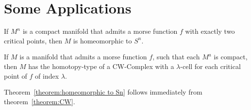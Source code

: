 \section{Some Applications}

\begin{theorem}
    \label{theorem:homeomorphic to Sn}
    If $M^n$ is a compact manifold that admits a morse function $f$ with 
    exactly two critical points, then $M$ is homeomorphic to $S^n$.
\end{theorem}

\begin{theorem}
    \label{theorem:CW}
    If $M$ is a manifold that admits a morse function $f$, such that each $M^a$
    is compact, then $M$ has the homotopy-type of a CW-Complex with a 
    $\lambda$-cell for each critical point of $f$ of index $\lambda$.
\end{theorem}

\begin{remark}
    Theorem~\ref{theorem:homeomorphic to Sn} follows immediately from
    theorem~\ref{theorem:CW}.
\end{remark}